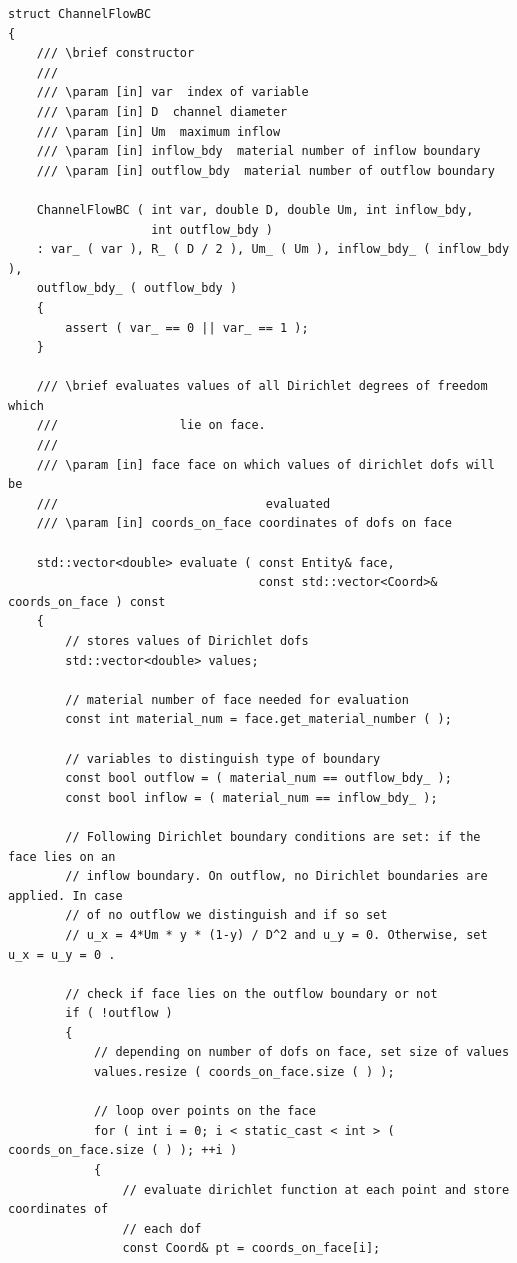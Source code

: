 \documentclass{article}
\begin{document}
\begin{lstlisting}[firstnumber=61]
struct ChannelFlowBC
{
    /// \brief constructor
    ///
    /// \param [in] var  index of variable
    /// \param [in] D  channel diameter
    /// \param [in] Um  maximum inflow
    /// \param [in] inflow_bdy  material number of inflow boundary
    /// \param [in] outflow_bdy  material number of outflow boundary

    ChannelFlowBC ( int var, double D, double Um, int inflow_bdy,
                    int outflow_bdy )
    : var_ ( var ), R_ ( D / 2 ), Um_ ( Um ), inflow_bdy_ ( inflow_bdy ),
    outflow_bdy_ ( outflow_bdy )
    {
        assert ( var_ == 0 || var_ == 1 );
    }

    /// \brief evaluates values of all Dirichlet degrees of freedom which
    /// 				lie on face.
    ///
    /// \param [in] face face on which values of dirichlet dofs will be
    /// 							evaluated
    /// \param [in] coords_on_face coordinates of dofs on face

    std::vector<double> evaluate ( const Entity& face,
                                   const std::vector<Coord>& coords_on_face ) const
    {
        // stores values of Dirichlet dofs
        std::vector<double> values;

        // material number of face needed for evaluation
        const int material_num = face.get_material_number ( );

        // variables to distinguish type of boundary
        const bool outflow = ( material_num == outflow_bdy_ );
        const bool inflow = ( material_num == inflow_bdy_ );

        // Following Dirichlet boundary conditions are set: if the face lies on an
        // inflow boundary. On outflow, no Dirichlet boundaries are applied. In case
        // of no outflow we distinguish and if so set
        // u_x = 4*Um * y * (1-y) / D^2 and u_y = 0. Otherwise, set u_x = u_y = 0 .

        // check if face lies on the outflow boundary or not
        if ( !outflow )
        {
            // depending on number of dofs on face, set size of values
            values.resize ( coords_on_face.size ( ) );

            // loop over points on the face
            for ( int i = 0; i < static_cast < int > ( coords_on_face.size ( ) ); ++i )
            {
                // evaluate dirichlet function at each point and store coordinates of
                // each dof
                const Coord& pt = coords_on_face[i];


\end{lstlisting}
\end{document}
